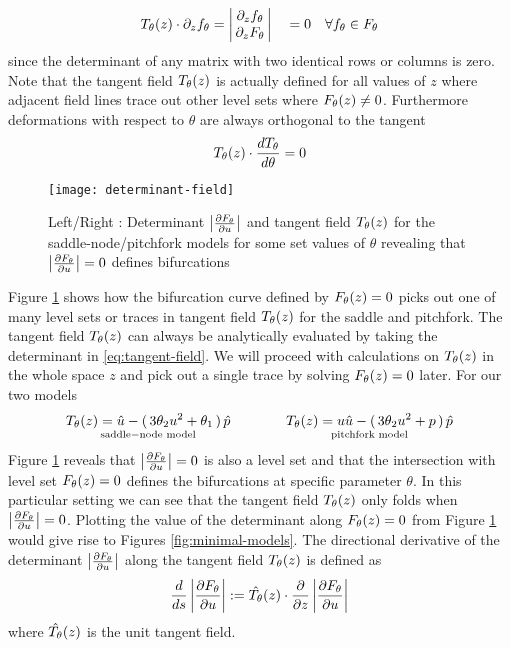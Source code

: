 \begin{align}
    T_{\theta}(z)\cdot\partial_z f_{\theta} =
    \left|\begin{matrix}
        \partial_z f_{\theta} \\
        \,\partial_{z}F_{\theta}\,
    \end{matrix}\right|
    \quad =0 \quad\forall f_{\theta}\in F_{\theta}
\end{align}
since the determinant of any matrix with two identical rows or columns is zero. Note that the tangent field $T_{\theta}(z)$ is actually defined for all values of $z$ where adjacent field lines trace out other level sets where $F_{\theta}(z)\neq0$. Furthermore deformations with respect to $\theta$ are always orthogonal to the tangent
\begin{align} %
    \tangent(z)\cdot\frac{d\tangent}{d\theta}=0
\end{align}
\begin{figure}
\centering
\texttt{[image: determinant-field]}
\caption{Left/Right : Determinant $\left| \frac{\partial F_{\theta}}{\partial u} \right|$ and tangent field $T_{\theta}(z)$ for the saddle-node/pitchfork models for some set values of $\theta$ revealing that $\left| \frac{\partial F_{\theta}}{\partial u} \right|=0$ defines bifurcations}
\label{fig:determinant-field}
\end{figure}
Figure \ref{fig:determinant-field} shows how the bifurcation curve defined by $F_{\theta}(z)=0$ picks out one of many level sets or traces in tangent field $T_{\theta}(z)$ for the saddle and pitchfork. The tangent field $T_{\theta}(z)$ can always be analytically evaluated by taking the determinant in \eqref{eq:tangent-field}. We will proceed with calculations on $T_{\theta}(z)$ in the whole space $z$ and pick out a single trace by solving $F_{\theta}(z)=0$ later. For our two models
\begin{align}
    \underset{\mathrm{saddle-node\,\,model}}{
    T_{\theta}(z)=\hat{u}-(\,3\theta_2 u^2+\theta_1\,)\,\hat{p}}
    \qquad\qquad
    \underset{\mathrm{pitchfork\,\,model}}{
    T_{\theta}(z)=u\hat{u}-(\,3\theta_2 u^2+p\,)\,\hat{p}}
    \label{eq:tangent-field-examples}
\end{align}
Figure \ref{fig:determinant-field} reveals that $\left| \frac{\partial F_{\theta}}{\partial u} \right|=0$ is also a level set and that the intersection with level set $F_{\theta}(z)=0$ defines the bifurcations at specific parameter $\theta$. In this particular setting we can see that the tangent field $T_{\theta}(z)$ only folds when $\left| \frac{\partial F_{\theta}}{\partial u} \right|=0$. Plotting the value of the determinant along $F_{\theta}(z)=0$ from Figure \ref{fig:determinant-field} would give rise to Figures \ref{fig:minimal-models}. The directional derivative of the determinant $\left| \frac{\partial F_{\theta}}{\partial u} \right|$ along the tangent field $T_{\theta}(z)$ is defined as
\begin{align}
    \frac{d}{ds}\left| \frac{\partial F_{\theta}}{\partial u} \right| := \hat{T_{\theta}}(z) \cdot \frac{\partial}{\partial z}\left| \frac{\partial F_{\theta}}{\partial u} \right| 
\end{align}
where $\hat{T_{\theta}}(z)$ is the unit tangent field.

